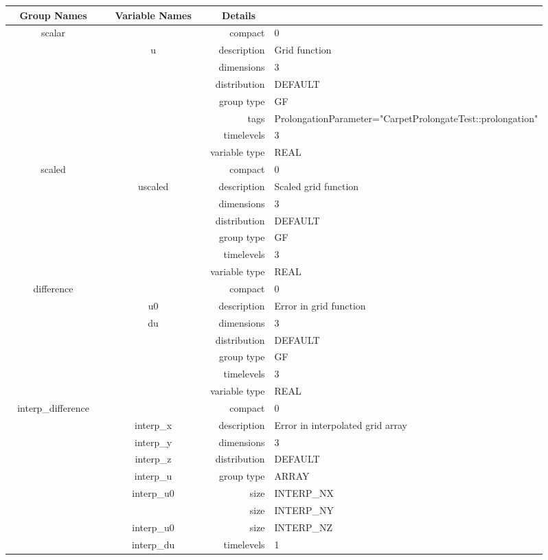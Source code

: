 \vspace{5mm}

\begin{tabular*}{150mm}{|c|c@{\extracolsep{\fill}}|rl|} \hline 
~ {\bf Group Names} ~ & ~ {\bf Variable Names} ~  &{\bf Details} ~ & ~\\ 
\hline 
scalar &  & compact & 0 \\ 
 & u & description & Grid function \\ 
 &  & dimensions & 3 \\ 
 &  & distribution & DEFAULT \\ 
 &  & group type & GF \\ 
 &  & tags & ProlongationParameter="CarpetProlongateTest::prolongation" \\ 
 &  & timelevels & 3 \\ 
 &  & variable type & REAL \\ 
\hline 
scaled &  & compact & 0 \\ 
 & uscaled & description & Scaled grid function \\ 
 &  & dimensions & 3 \\ 
 &  & distribution & DEFAULT \\ 
 &  & group type & GF \\ 
 &  & timelevels & 3 \\ 
 &  & variable type & REAL \\ 
\hline 
difference &  & compact & 0 \\ 
 & u0 & description & Error in grid function \\ 
 & du & dimensions & 3 \\ 
 &  & distribution & DEFAULT \\ 
 &  & group type & GF \\ 
 &  & timelevels & 3 \\ 
 &  & variable type & REAL \\ 
\hline 
interp\_difference &  & compact & 0 \\ 
 & interp\_x & description & Error in interpolated grid array \\ 
 & interp\_y & dimensions & 3 \\ 
 & interp\_z & distribution & DEFAULT \\ 
 & interp\_u & group type & ARRAY \\ 
 & interp\_u0 & size & INTERP\_NX \\ 
& ~ & size & INTERP\_NY \\ 
 & interp\_u0 & size & INTERP\_NZ \\ 
 & interp\_du & timelevels & 1 \\ 

\end{tabular*}
